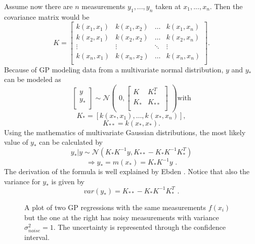 Assume now there are $n$ measurements $y_1, ..., y_n$ taken at $x_1, ..., x_n$. Then the covariance matrix would be
$$
K = \begin{bmatrix}
k(x_1, x_1) & k(x_1, x_2) & \dots & k(x_1, x_n) \\
k(x_2, x_1) & k(x_2, x_2) & \dots & k(x_2, x_n) \\
\vdots & \vdots & \ddots & \vdots \\
k(x_n, x_1) & k(x_n, x_2) & \dots & k(x_n, x_n) \\
\end{bmatrix}\text{.}
$$
Because of GP modeling data from a multivariate normal distribution, $y$ and $y_*$ can be modeled as
$$
\begin{bmatrix}
y \\
y_* \\
\end{bmatrix} 
\sim
\mathcal{N} 
\begin{pmatrix}
0, 
\begin{bmatrix}
K & K_*^T \\
K_* & K_{**} \\
\end{bmatrix}
\end{pmatrix}\text{with}
$$
$$
K_* = [k(x_*, x_1), \dots, k(x_*, x_n)],
$$
$$
K_{**} = k(x_*, x_*)\text{.}
$$
Using the mathematics of multivariate Gaussian distributions, the most likely value of $y_*$ can be calculated by
$$
y_*|y \sim \mathcal{N}(K_*K^{-1}y, K_{**} - K_*K^{-1}K_*^T)
$$
$$
\Rightarrow {y}_* = m(x_*) = K_*K^{-1}y\text{ .}
$$
The derivation of the formula is well explained by Ebden \cite{ebden_gaussian_2015}. Notice that also the variance for $y_*$ is given by
$$
var(y_*) = K_{**} - K_*K^{-1}K_*^T\text{ .}
$$

\begin{figure}[h!]
	\centering	
	\caption{
		A plot of two GP regressions with the same measurements $f(x_i)$ but the one at the right has noisy measurements with variance $\sigma_{noise}^2 = 1$. The uncertainty is represented through the confidence interval.
	}
	\label{fig:gaussian_process_example}
\end{figure}

